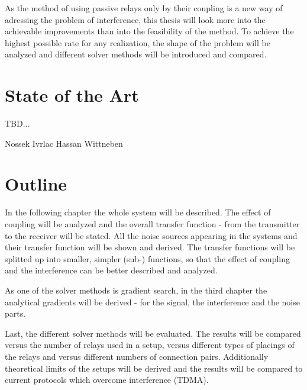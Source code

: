 As the method of using passive relays only by their coupling is a new way of adressing the problem of interference, this thesis will look more into the achievable improvements than into the feasibility of the method.
To achieve the highest possible rate for any realization, the shape of the problem will be analyzed and different solver methods will be introduced and compared.


\section{State of the Art}
\label{sec:SoA}

TBD...

Nossek Ivrlac
Hassan Wittneben




\section{Outline}
\label{sec:outline}

In the following chapter the whole system will be described.
The effect of coupling will be analyzed and the overall transfer function - from the transmitter to the receiver will be stated.
All the noise sources appearing in the systems and their transfer function will be shown and derived.
The transfer functions will be splitted up into smaller, simpler (sub-) functions, so that the effect of coupling and the interference can be better described and analyzed.

As one of the solver methods is gradient search, in the third chapter the analytical gradients will be derived - for the signal, the interference and the noise parts.

Last, the different solver methods will be evaluated.
The results will be compared versus the number of relays used in a setup,
versus different types of placings of the relays and versus different numbers of connection pairs.
Additionally theoretical limits of the setups will be derived and the results will be compared to current protocols which overcome interference (TDMA).













